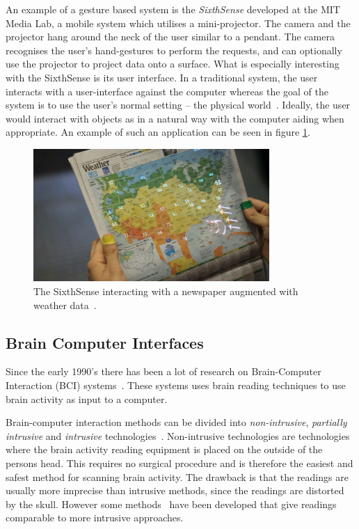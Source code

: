 An example of a gesture based system is the \emph{SixthSense} developed at the MIT Media Lab, a mobile system which utilises a mini-projector. The camera and the projector hang around the neck of the user similar to a pendant. The camera recognises the user's hand-gestures to perform the requests, and can optionally use the projector to project data onto a surface. What is especially interesting with the SixthSense is its user interface. In a traditional system, the user interacts with a user-interface against the computer whereas the goal of the system is to use the user's normal setting -- the physical world~\cite{Mistry:2009:SWG:1667146.1667160}. Ideally, the user would interact with objects as in a natural way with the computer aiding when appropriate. An example of such an application can be seen in figure \ref{sixthsense}.


\begin{figure}[]
\includegraphics[width=0.8\textwidth] {bilder/newspaper.jpg}
\caption{The SixthSense interacting with a newspaper augmented with weather data~\cite{newspaper}.}
\label{sixthsense}
\end{figure}


\subsection{Brain Computer Interfaces}

Since the early 1990's there has been a lot of research on Brain-Computer Interaction (BCI) systems~\cite{lebedev2006brain}. These systems uses brain reading techniques to use brain activity as input to a computer.

Brain-computer interaction methods can be divided into \emph{non-intrusive}, \emph{partially intrusive} and \emph{intrusive} technologies~\cite{legobrain}. Non-intrusive technologies are technologies where the brain activity reading equipment is placed on the outside of the persons head. This requires no surgical procedure and is therefore the easiest and safest method for scanning brain activity. The drawback is that the readings are usually more imprecise than intrusive methods, since the readings are distorted by the skull. However some methods~\cite{doud2011continuous} have been developed that give readings comparable to more intrusive approaches.

